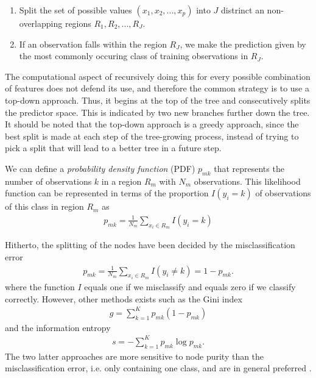 \begin{enumerate}
  \item Split the set of possible values $(x_1, x_2,...,x_p)$ into $J$ distrinct an non-overlapping regions $R_1, R_2, ..., R_{J}$.
  \item If an observation falls within the region $R_J$, we make the prediction given by the most commonly occuring class of training observations in $R_{J}$.
\end{enumerate}

The computational aspect of recursively doing this for every possible combination of features does not defend its use, and therefore the common strategy is to use a top-down approach. Thus, it begins at the top of the tree and consecutively splits the predictor space. This is indicated by two new branches further down the tree. It should be noted that the top-down approach is a greedy approach, since the best split is made at each step of the tree-growing process, instead of trying to pick a split that will lead to a better tree in a future step.

We can define a \textit{probability density function} (PDF) $p_{mk}$ that represents the number of observations $k$ in a region $R_m$ with $N_m$ observations. This likelihood function can be represented in terms of the proportion $I(y_i = k)$ of observations of this class in region $R_m$ as
\begin{align}
  p_{mk} = \frac{1}{N_m} \sum_{x_i \in R_m} I(y_i = k)
\end{align}

Hitherto, the splitting of the nodes have been decided by the misclassification error
\begin{align}
  p_{mk} = \frac{1}{N_m} \sum_{x_i \in R_m} I(y_i \neq k) = 1 - p_{mk}.
\end{align}
where the function $I$ equals one if we misclassify and equals zero if we classify correctly. However, other methods exists such as the Gini index
\begin{align}
  g = \sum_{k=1}^{K} p_{mk} (1-p_{mk})
\end{align}
and the information entropy
\begin{align}
  s = - \sum_{k=1}^{K} p_{mk} \log p_{mk}.
\end{align}
The two latter approaches are more sensitive to node purity than the misclassification error, i.e. only containing one class, and are in general preferred \cite{Murphy2012}.

